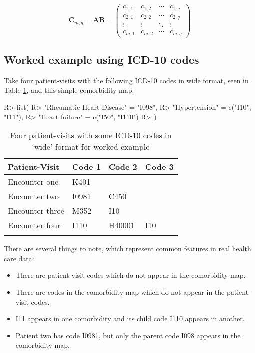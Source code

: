 \documentclass[article]{jss}
\providecommand{\tightlist}{%
  \setlength{\itemsep}{0pt}\setlength{\parskip}{0pt}}
\begin{document}
\[\boldsymbol{C}_{m,q} =
\boldsymbol{A}\boldsymbol{B} =
\begin{pmatrix}
c_{1,1} & c_{1,2} & \cdots & c_{1,q} \\
c_{2,1} & c_{2,2} & \cdots & c_{2,q} \\
\vdots  & \vdots  & \ddots & \vdots  \\
c_{m,1} & c_{m,2} & \cdots & c_{m,q}
\end{pmatrix}\]\label{eq:C}

\hypertarget{workedex}{%
\subsection{Worked example using ICD-10 codes}\label{workedex}}

Take four patient-visits with the following ICD-10 codes in wide format,
seen in Table \ref{tab:workedexinput}, and this simple comorbidity map:

\begin{CodeChunk}

\begin{CodeInput}
R> list(
R>   "Rheumatic Heart Disease" = "I098",
R>   "Hypertension" = c("I10", "I11"),
R>   "Heart failure" = c("I50", "I110")
R> )
\end{CodeInput}
\end{CodeChunk}

\begin{longtable}{l|l|l|l}
\hline
Patient-Visit & Code 1 & Code 2 & Code 3\\
\hline
Encounter one & K401 &  & \\
\hline
Encounter two & I0981 & C450 & \\
\hline
Encounter three & M352 & I10 & \\
\hline
Encounter four & I110 & H40001 & I10\\
\hline
\caption{\label{tab:workedexinput}Four patient-visits with some ICD-10 codes in `wide' format for worked example}\\
\end{longtable}

There are several things to note, which represent common features in
real health care data:

\begin{itemize}
\tightlist
\item
  There are patient-visit codes which do not appear in the comorbidity
  map.
\item
  There are codes in the comorbidity map which do not appear in the
  patient-visit codes.
\item
  I11 appears in one comorbidity and its child code I110 appears in
  another.
\item
  Patient two has code I0981, but only the parent code I098 appears in
  the comorbidity map.
\end{itemize}
\end{document}

